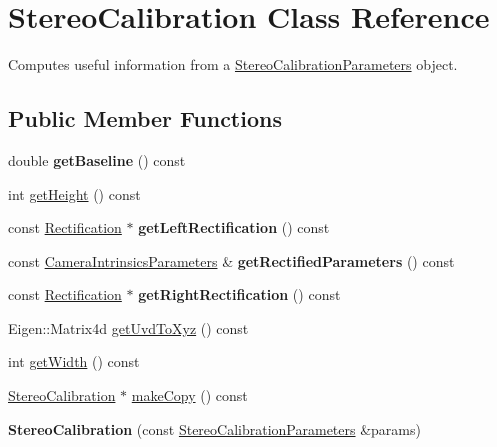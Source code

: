 \hypertarget{classfovis_1_1StereoCalibration}{
\section{StereoCalibration Class Reference}
\label{classfovis_1_1StereoCalibration}
}


Computes useful information from a \hyperlink{structfovis_1_1StereoCalibrationParameters}{StereoCalibrationParameters} object.  


\subsection*{Public Member Functions}
\begin{DoxyCompactItemize}
\item 
\hypertarget{classfovis_1_1StereoCalibration_a1941b0a011e836e922ce08cf48c635f9}{
double {\bfseries getBaseline} () const }
\label{classfovis_1_1StereoCalibration_a1941b0a011e836e922ce08cf48c635f9}

\item 
int \hyperlink{classfovis_1_1StereoCalibration_a317329daf960a1759801c0f16d43d5a3}{getHeight} () const 
\item 
\hypertarget{classfovis_1_1StereoCalibration_a536e3a1c9ce494e4aa7fd26b6052dcdf}{
const \hyperlink{classfovis_1_1Rectification}{Rectification} $\ast$ {\bfseries getLeftRectification} () const }
\label{classfovis_1_1StereoCalibration_a536e3a1c9ce494e4aa7fd26b6052dcdf}

\item 
\hypertarget{classfovis_1_1StereoCalibration_ab2d2a83222ec0129d145428e46ef3402}{
const \hyperlink{structfovis_1_1CameraIntrinsicsParameters}{CameraIntrinsicsParameters} \& {\bfseries getRectifiedParameters} () const }
\label{classfovis_1_1StereoCalibration_ab2d2a83222ec0129d145428e46ef3402}

\item 
\hypertarget{classfovis_1_1StereoCalibration_a20ce4a3aaa724f8cf89da6d3c7fc9a6a}{
const \hyperlink{classfovis_1_1Rectification}{Rectification} $\ast$ {\bfseries getRightRectification} () const }
\label{classfovis_1_1StereoCalibration_a20ce4a3aaa724f8cf89da6d3c7fc9a6a}

\item 
Eigen::Matrix4d \hyperlink{classfovis_1_1StereoCalibration_a1719db5b17bd3d44657bad9a41000696}{getUvdToXyz} () const 
\item 
int \hyperlink{classfovis_1_1StereoCalibration_af149cb053bc8b5fbc1364b5dbb934488}{getWidth} () const 
\item 
\hyperlink{classfovis_1_1StereoCalibration}{StereoCalibration} $\ast$ \hyperlink{classfovis_1_1StereoCalibration_ac9cd053e6a872120501d02a8380ae7f5}{makeCopy} () const 
\item 
\hypertarget{classfovis_1_1StereoCalibration_a458a750c764033004d225eb12061784d}{
{\bfseries StereoCalibration} (const \hyperlink{structfovis_1_1StereoCalibrationParameters}{StereoCalibrationParameters} \&params)}
\label{classfovis_1_1StereoCalibration_a458a750c764033004d225eb12061784d}

\end{DoxyCompactItemize}


